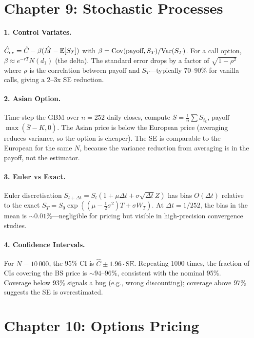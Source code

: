 \section*{Chapter 9: Stochastic Processes}

\paragraph{1. Control Variates.}
$\hat{C}_{\text{cv}} = \hat{C} - \beta(\hat{M} - \mathbb{E}[S_T])$ with
$\beta = \text{Cov}(\text{payoff}, S_T) / \text{Var}(S_T)$. For a call option,
$\beta \approx e^{-rT} N(d_1)$ (the delta). The standard error drops
by a factor of $\sqrt{1 - \rho^2}$ where $\rho$ is the
correlation between payoff and $S_T$---typically 70--90\% for
vanilla calls, giving a 2--3x SE reduction.

\paragraph{2. Asian Option.}
Time-step the GBM over $n = 252$ daily closes, compute $\bar S =
\frac{1}{n} \sum S_{t_k}$, payoff $\max(\bar S - K, 0)$. The Asian
price is below the European price (averaging reduces variance, so
the option is cheaper). The SE is comparable to the European for
the same $N$, because the variance reduction from averaging is in
the payoff, not the estimator.

\paragraph{3. Euler vs Exact.}
Euler discretisation $S_{t+\Delta t} = S_t(1 + \mu \Delta t + \sigma
\sqrt{\Delta t} Z)$ has bias $O(\Delta t)$ relative to the exact
$S_T = S_0 \exp((\mu - \tfrac{1}{2}\sigma^2)T + \sigma W_T)$. At
$\Delta t = 1/252$, the bias in the mean is $\sim 0.01\%$---negligible
for pricing but visible in high-precision convergence studies.

\paragraph{4. Confidence Intervals.}
For $N = 10\,000$, the 95\% CI is $\hat{C} \pm 1.96 \cdot
\text{SE}$. Repeating 1000 times, the fraction of CIs covering the
BS price is $\sim 94$--$96\%$, consistent with the nominal 95\%.
Coverage below 93\% signals a bug (e.g., wrong discounting); coverage
above 97\% suggests the SE is overestimated.

\section*{Chapter 10: Options Pricing}

